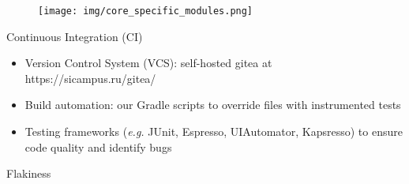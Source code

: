 \documentclass{beamer}%
\begin{document}
\begin{frame}{}
\begin{changemargin}
\footnotesize

\begin{figure}[h]
\begin{minipage}[h]{0.91\linewidth}
\hbox{\hspace{-2em}\texttt{[image: img/core\_specific\_modules.png]}}
\end{minipage}
\end{figure}

\end{changemargin}
\end{frame}
\begin{frame}{Continuous Integration (CI)}
\begin{changemargin}
\footnotesize


\begin{itemize}
\item Version Control System (VCS): self-hosted gitea at https://sicampus.ru/gitea/
\item Build automation: our Gradle scripts to override files with instrumented tests
\item Testing frameworks (\textit{e.g.} JUnit, Espresso, UIAutomator, Kapsresso) to ensure code quality and identify bugs
\end{itemize}




\end{changemargin}
\end{frame}
\begin{frame}{Flakiness}
\begin{changemargin}
\footnotesize




\end{changemargin}
\end{frame}
\end{document}
